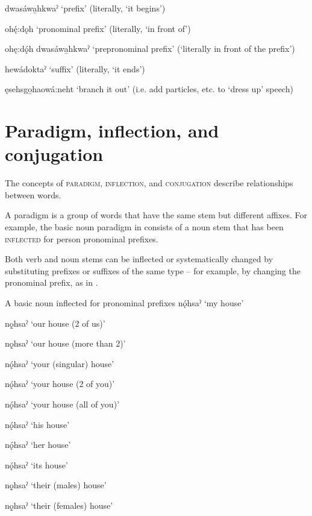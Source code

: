 \ex dwasáwa̱hkwaˀ ‘prefix’ (literally, ‘it begins’)\label{ex:cayugaprefsufstemidex3e}

\ex ohę́:dǫh ‘pronominal prefix’ (literally, ‘in front of’)\label{ex:cayugaprefsufstemidex3f}

\ex ohę:dǫ́h dwasáwa̱hkwaˀ ‘prepronominal prefix’ (‘literally in front of the prefix’)\label{ex:cayugaprefsufstemidex3g}

\ex hewádoktaˀ ‘suffix’ (literally, ‘it ends’)\label{ex:cayugaprefsufstemidex3h}

\ex ęsehsgo̱haowá:neht ‘branch it out’ (i.e. add particles, etc. to ‘dress up’ speech)\label{ex:cayugaprefsufstemidex3i}
\z
\z 

\largerpage
\section{Paradigm, inflection, and conjugation} \label{Paradigm, inflection, and conjugation}
The concepts of \textsc{paradigm}, \textsc{inflection}, and \textsc{conjugation} describe relationships between words.

A paradigm is a group of words that have the same stem but different affixes. For example, the basic noun paradigm in  consists of a noun stem that has been \textsc{inflected} for person pronominal prefixes. 

Both verb and noun stems can be inflected or systematically changed by substituting prefixes or suffixes of the same type -- for example, by changing the pronominal prefix, as in . 
 
\ea\label{ex:prefsufstemidex4} A basic noun inflected for pronominal prefixes
\ea {}nǫ́hsaˀ ‘my house’

\ex {}nǫ̱hsaˀ ‘our house (2 of us)’

\ex {}nǫ̱hsaˀ ‘our house (more than 2)’

\ex {}nǫ́hsaˀ ‘your (singular) house’

\ex {}nǫ́hsaˀ ‘your house (2 of you)’

\ex {}nǫ́hsaˀ ‘your house (all of you)’

\ex {}nǫ́hsaˀ ‘his house’

\ex {}nǫ́hsaˀ ‘her house’

\ex {}nǫ́hsaˀ ‘its house’

\ex {}nǫ̱hsaˀ ‘their (males) house’

\ex {}nǫ̱hsaˀ ‘their (females) house’

